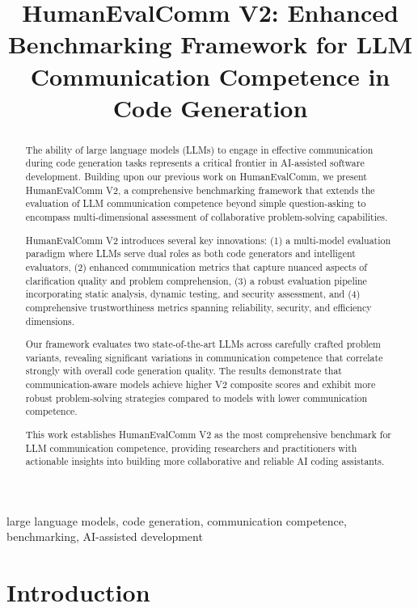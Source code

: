 \documentclass[conference]{IEEEtran}
\title{HumanEvalComm V2: Enhanced Benchmarking Framework for LLM Communication Competence in Code Generation}
\begin{document}
\maketitle

\begin{abstract}
The ability of large language models (LLMs) to engage in effective communication during code generation tasks represents a critical frontier in AI-assisted software development. Building upon our previous work on HumanEvalComm, we present HumanEvalComm V2, a comprehensive benchmarking framework that extends the evaluation of LLM communication competence beyond simple question-asking to encompass multi-dimensional assessment of collaborative problem-solving capabilities.

HumanEvalComm V2 introduces several key innovations: (1) a multi-model evaluation paradigm where LLMs serve dual roles as both code generators and intelligent evaluators, (2) enhanced communication metrics that capture nuanced aspects of clarification quality and problem comprehension, (3) a robust evaluation pipeline incorporating static analysis, dynamic testing, and security assessment, and (4) comprehensive trustworthiness metrics spanning reliability, security, and efficiency dimensions.

Our framework evaluates two state-of-the-art LLMs across carefully crafted problem variants, revealing significant variations in communication competence that correlate strongly with overall code generation quality. The results demonstrate that communication-aware models achieve higher V2 composite scores and exhibit more robust problem-solving strategies compared to models with lower communication competence.

This work establishes HumanEvalComm V2 as the most comprehensive benchmark for LLM communication competence, providing researchers and practitioners with actionable insights into building more collaborative and reliable AI coding assistants.
\end{abstract}

\begin{IEEEkeywords}
large language models, code generation, communication competence, benchmarking, AI-assisted development
\end{IEEEkeywords}

\section{Introduction}
\end{document}
